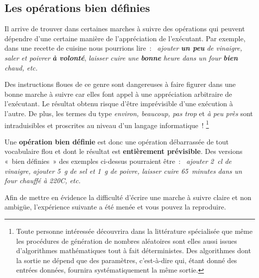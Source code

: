 		\subsection{Les opérations bien définies}
		
			Il arrive de trouver dans certaines marches à suivre 
			des opérations qui peuvent dépendre d’une certaine manière 
			de l’appréciation de l’exécutant. 
			Par exemple, dans une recette de cuisine nous pourrions lire~:~
			\textit{ajouter} \textbf{\textit{un peu}} 
			\textit{de vinaigre, saler et poivrer} 
			\textbf{\textit{à volonté}}, \textit{laisser cuire une} 
			\textbf{\textit{bonne}}
			\textit{ heure dans un four}
			\textbf{\textit{bien}} \textit{chaud, etc.}
			
			Des instructions floues de ce genre 
			sont dangereuses à faire figurer dans une bonne marche à suivre 
			car elles font appel à une appréciation arbitraire de l’exécutant. 
			Le résultat obtenu risque d’être imprévisible 
			d’une exécution à l’autre. 
			De plus, les termes du type \textit{environ, beaucoup, pas trop} 
			et \textit{à peu près} sont intraduisibles 
			et proscrites au niveau d’un langage informatique~!%
			\footnote{%
				Toute personne intéressée découvrira dans la littérature
				spécialisée que même les procédures de génération de nombres
				aléatoires sont elles aussi issues d’algorithmes mathématiques
				tout à fait déterministes. Des algorithmes dont la sortie ne
				dépend que des paramètres, c'est-à-dire qui, étant donné des
				entrées données, fournira systématiquement la même sortie.
			}
			
			Une \textbf{opération bien définie} 
			est donc une opération débarrassée
			de tout vocabulaire flou 
			et dont le résultat est \textbf{entièrement prévisible}. 
			Des versions «~bien définies~» des exemples ci-dessus
			pourraient être~:~
			\textit{ajouter 2~cl de vinaigre, ajouter 5~g de sel
			et 1~g de poivre, 
			laisser cuire 65~minutes dans un four chauffé à 220\degre{}C, etc.}
	
			Afin de mettre en évidence la difficulté d’écrire une marche
			à suivre claire et non ambigüe, l’expérience suivante a été menée et
			vous pouvez la reproduire.
	

